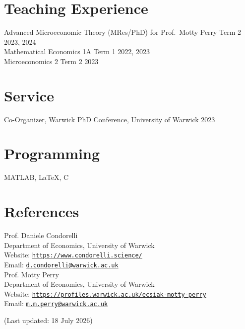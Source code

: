 \documentclass[11pt]{article}
\begin{document}
\section*{Teaching Experience}
Advanced Microeconomic Theory (MRes/PhD) for Prof.\ Motty Perry \hfill Term 2 2023, 2024\\
Mathematical Economics 1A \hfill Term 1 2022, 2023\\
Microeconomics 2 \hfill Term 2 2023

\section*{Service}
Co-Organizer, Warwick PhD Conference, University of Warwick \hfill 2023


\section*{Programming}
MATLAB, \LaTeX{}, C


\section*{References}
{Prof. Daniele Condorelli}\\
Department of Economics, University of Warwick\\
Website: \href{https://www.condorelli.science/}{\texttt{https://www.condorelli.science/}}\\
Email: \href{mailto:d.condorelli@warwick.ac.uk}{\texttt{d.condorelli@warwick.ac.uk}}\\[11pt]
{Prof. Motty Perry}\\
Department of Economics, University of Warwick\\
Website: \href{https://profiles.warwick.ac.uk/ecsiak-motty-perry}{\texttt{https://profiles.warwick.ac.uk/ecsiak-motty-perry}}\\
Email: \href{mailto:M.M.Perry@warwick.ac.uk}{\texttt{m.m.perry@warwick.ac.uk}}


\vspace{30pt}

{\small (Last updated: 18 July 2026)}
\end{document}
